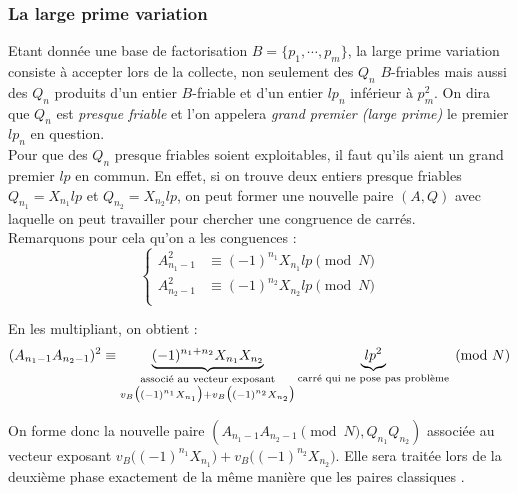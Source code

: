 \subsubsection{La \og large prime variation \fg{}}

Etant donnée une base de factorisation $B = \{ p_1, \cdots, p_m\}$, la \og large
prime variation \fg{} consiste à accepter lors de la collecte, non seulement des 
$Q_n$ $B$-friables mais aussi des $Q_n$ produits d'un entier $B$-friable et d'un
entier $lp_n$ inférieur à $p_m^2$. On dira que $Q_n$ est \emph{presque friable}
et l'on appelera \emph{grand premier (large prime)} le premier $lp_n$ en question. \\

Pour que des $Q_n$ presque friables soient exploitables, il faut qu'ils aient
un grand premier $lp$ en commun. En effet, si on trouve deux entiers presque
friables $Q_{n_1} = X_{n_1}lp $ et $Q_{n_2} =  X_{n_2}lp $, on peut former une
nouvelle paire $(A,Q)$ avec laquelle on peut travailler pour chercher une 
congruence de carrés. \\ 

Remarquons pour cela qu'on a les conguences :
\begin{equation*}
  \left\{
      \begin{aligned}
          A_{n_1 -1}^2 &\equiv (-1)^{n_1} X_{n_1}lp\pmod{N} \\
          A_{n_2 -1}^2 &\equiv (-1)^{n_2} X_{n_2}lp\pmod{N}\\
        \end{aligned}
    \right.
\end{equation*}

En les multipliant, on obtient : 
\[  (A_{n_1 -1} A_{n_2 -1})^2 \equiv 
     \underbrace{(-1)^{n_1 + n_2} X_{n_1} X_{n_2}}_
            {\begin{subarray}{c}\text{associé au vecteur exposant}\\
             v_{B} \big( (-1 )^{n_1} X_{n_1} \big)
             + v_{B} \big( (-1 )^{n_2} X_{n_2} \big) \end{subarray}
             }
    \underbrace{lp^2}_{\text{carré qui ne pose pas problème}}
    \pmod{N}
 \]
  
On forme donc la nouvelle paire $ (A_{n_1-1}A_{n_2 -1} \pmod{N}, Q_{n_1}Q_{n_2}) $
associée au vecteur exposant $v_{B} \big( (-1 )^{n_1} X_{n_1} \big)+
v_{B} \big( (-1 )^{n_2} X_{n_2} \big) $.  Elle sera traitée lors de la 
deuxième phase exactement de la même manière que les paires \og classiques \fg{}.\\

